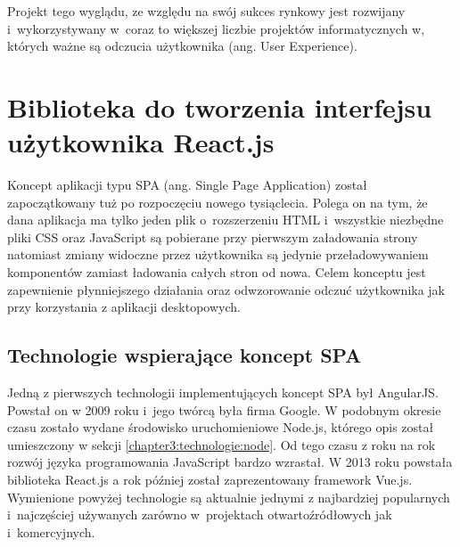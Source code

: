 \documentclass[../Kamil_Kowalewski_Main.tex]{subfiles}
\begin{document}
{{{{                Projekt tego wyglądu, ze względu na swój sukces rynkowy jest rozwijany
                i~wykorzystywany w~coraz to większej liczbie projektów informatycznych
                w, których ważne są odczucia użytkownika (ang. User Experience).
            }
        }
    }

    \section{Biblioteka do tworzenia interfejsu użytkownika React.js}
    \label{chapter3:technologie:react} {
        Koncept aplikacji typu SPA (ang. Single Page Application) został zapoczątkowany
        tuż po rozpoczęciu nowego tysiąclecia. Polega on na tym, że dana aplikacja ma
        tylko jeden plik o~rozszerzeniu HTML i~wszystkie niezbędne pliki CSS oraz
        JavaScript są pobierane przy pierwszym załadowania strony natomiast zmiany
        widoczne przez użytkownika są jedynie przeładowywaniem komponentów zamiast
        ładowania całych stron od nowa. Celem konceptu jest zapewnienie płynniejszego
        działania oraz odwzorowanie odczuć użytkownika jak przy korzystania z aplikacji
        desktopowych.

        \subsection{Technologie wspierające koncept SPA}
        \label{chapter3:technologie:react:spa_frameworks} {
            Jedną z pierwszych technologii implementujących koncept SPA był
            AngularJS\cite{website:angular}. Powstał on w 2009 roku i~jego twórcą była
            firma Google. W podobnym okresie czasu zostało wydane środowisko
            uruchomieniowe Node.js, którego opis został umieszczony w sekcji
            \ref{chapter3:technologie:node}. Od tego czasu z roku na rok rozwój języka
            programowania JavaScript bardzo wzrastał. W 2013 roku powstała biblioteka
            React.js\cite{website:react} a rok później został zaprezentowany framework
            Vue.js\cite{website:vue}. Wymienione powyżej technologie są aktualnie
            jednymi z najbardziej popularnych i~najczęściej używanych zarówno w~projektach
            otwartoźródłowych jak i~komercyjnych.
        }

}}
\end{document}
